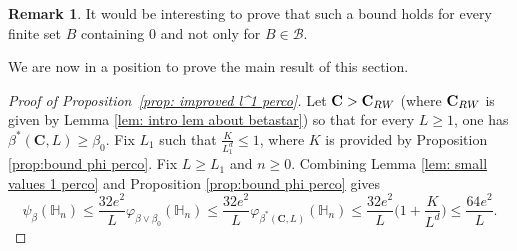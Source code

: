 \documentclass[11pt,a4paper]{article}
\numberwithin{equation}{section}
\theoremstyle{plain}
\theoremstyle{definition}
\newtheorem{Rem}[Thm]{Remark}
\newcommand\bfC{\mathbf{C}}
\begin{document}
\begin{Rem}\label{rem: generalise the bound on phi} It would be interesting to prove that such a bound holds for every finite set $B$ containing $0$ and not only for $B\in \mathcal B$. 
%
\end{Rem}

We are now in a position to prove the main result of this section.

\begin{proof}[Proof of Proposition~\textup{\ref{prop: improved l^1 perco}}] Let $\bfC>\bfC_{\rm RW}$ (where $\bfC_{\rm RW}$ is given by Lemma \ref{lem: intro lem about betastar}) so that for every $L\geq 1$, one has $\beta^*(\bfC,L)\geq \beta_0$. Fix $L_1$ such that $\tfrac{K}{L_1^d}\leq 1$, where $K$ is provided by Proposition \ref{prop:bound phi perco}. Fix $L\ge L_1$ and $n\geq 0$. Combining Lemma \ref{lem: small values 1 perco} and Proposition \ref{prop:bound phi perco} gives
\begin{equation}
	\psi_\beta(\mathbb H_n)\leq \frac{32e^2}{L}\varphi_{\beta\vee \beta_0}(\mathbb H_n)\leq \frac{32e^2}{L}\varphi_{\beta^*(\bfC,L)}(\mathbb H_n)\leq \frac{32e^2}{L}\Big(1+\frac{K}{L^d}\Big)\leq \frac{64e^2}{L}.
\end{equation}%
\end{proof}
\end{document}

